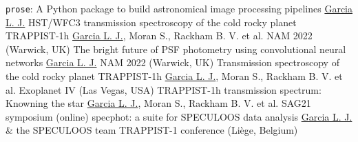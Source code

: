     {\texttt{prose}: A Python package to build astronomical image processing pipelines}
    {\underline{Garcia L. J.}}
    {}
    {HST/WFC3 transmission spectroscopy of the cold rocky planet TRAPPIST-1h}
    {\underline{Garcia L. J.}, Moran S., Rackham B. V. et al.}
    {NAM 2022 (Warwick, UK)}
    {The bright future of PSF photometry using convolutional neural networks}
    {\underline{Garcia L. J.}}
    {NAM 2022 (Warwick, UK)}
    {Transmission spectroscopy of the cold rocky planet TRAPPIST-1h}
    {\underline{Garcia L. J.}, Moran S., Rackham B. V. et al.}
    {Exoplanet IV (Las Vegas, USA)}
    {TRAPPIST-1h transmission spectrum: Knowning the star}
    {\underline{Garcia L. J.}, Moran S., Rackham B. V. et al.}
    {SAG21 symposium (online)}
    {specphot: a suite for SPECULOOS data analysis}
    {\underline{Garcia L. J.} \& the SPECULOOS team}
    {TRAPPIST-1 conference (Liège, Belgium)}
